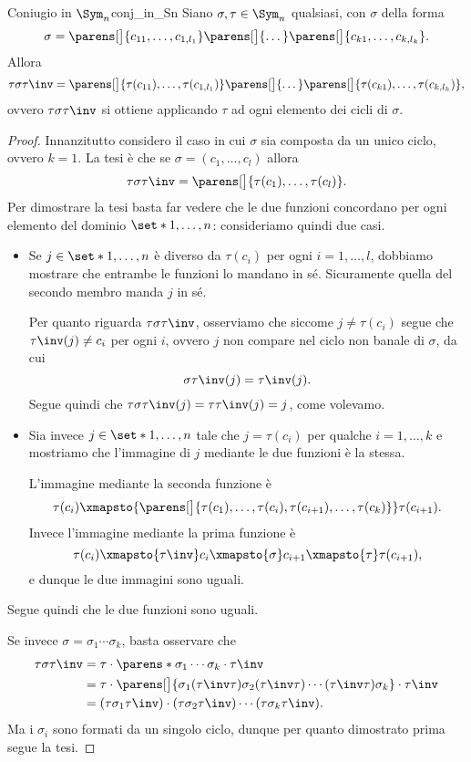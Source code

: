 \begin{lemma}
    {Coniugio in $\Sym_n$}{conj_in_Sn}
    Siano $\sigma, \tau \in \Sym_n$ qualsiasi, con $\sigma$ della forma \[
        \sigma = \parens[\big]{c_{11}, \dots, c_{1, l_1}}\parens[\big]{\dots}\parens[\big]{c_{k1}, \dots, c_{k, l_k}}.
    \] Allora \[
        \tau\sigma\tau\inv = \parens[\big]{\tau(c_{11}), \dots, \tau(c_{1, l_1})}\parens[\big]{\dots}\parens[\big]{\tau(c_{k1}), \dots, \tau(c_{k, l_k})},
    \] ovvero $\tau\sigma\tau\inv$ si ottiene applicando $\tau$ ad ogni elemento dei cicli di $\sigma$. 
\end{lemma}
\begin{proof}
    Innanzitutto considero il caso in cui $\sigma$ sia composta da un unico ciclo, ovvero $k=1$. La tesi è che se $\sigma = (c_1, \dots, c_l)$ allora \[
        \tau\sigma\tau\inv = \parens[\big]{\tau(c_1), \dots, \tau(c_l)}.
    \] Per dimostrare la tesi basta far vedere che le due funzioni concordano per ogni elemento del dominio $\set*{1, \dots, n}$: consideriamo quindi due casi.
    \begin{itemize}
        \item Se $j \in \set*{1, \dots, n}$ è diverso da $\tau(c_i)$ per ogni $i = 1, \dots, l$, dobbiamo mostrare che entrambe le funzioni lo mandano in sé. Sicuramente quella del secondo membro manda $j$ in sé.
        
        Per quanto riguarda $\tau\sigma\tau\inv$, osserviamo che siccome $j \neq \tau(c_i)$ segue che $\tau\inv(j) \neq c_i$ per ogni $i$, ovvero $j$ non compare nel ciclo non banale di $\sigma$, da cui \[
            \sigma\tau\inv (j) = \tau\inv(j).
        \] Segue quindi che $\tau\sigma\tau\inv(j) = \tau\tau\inv(j) = j$, come volevamo.
        \item Sia invece $j \in \set*{1, \dots, n}$ tale che $j = \tau(c_i)$ per qualche $i = 1, \dots, k$ e mostriamo che l'immagine di $j$ mediante le due funzioni è la stessa.
        
        L'immagine mediante la seconda funzione è \[
            \tau(c_i) \xmapsto{\parens[\big]{\tau(c_1), \dots, \tau(c_i), \tau(c_{i+1}), \dots, \tau(c_k)}} \tau(c_{i+1}).
        \] Invece l'immagine mediante la prima funzione è \[
            \tau(c_i) \xmapsto{\tau\inv} c_i \xmapsto{\sigma} c_{i+1} \xmapsto{\tau} \tau(c_{i+1}),
        \] e dunque le due immagini sono uguali.
    \end{itemize} 

    Segue quindi che le due funzioni sono uguali.

    Se invece $\sigma = \sigma_1\cdots\sigma_k$, basta osservare che \begin{align*}
        \tau\sigma\tau\inv 
        &= \tau \cdot \parens*{\sigma_1 \cdots \sigma_k} \cdot \tau\inv\\
        &= \tau\cdot \parens[\big]{\sigma_1(\tau\inv\tau)\sigma_2(\tau\inv\tau)\cdots (\tau\inv\tau)\sigma_k} \cdot \tau\inv\\
        &= (\tau\sigma_1\tau\inv) \cdot (\tau\sigma_2\tau\inv) \cdots (\tau\sigma_k\tau\inv).
    \end{align*} Ma i $\sigma_i$ sono formati da un singolo ciclo, dunque per quanto dimostrato prima segue la tesi.
\end{proof}

